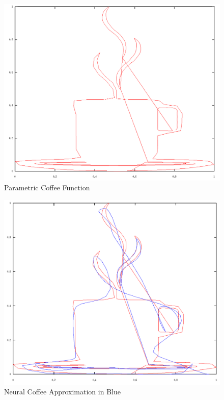 \documentclass{article}
\begin{document}
\begin{figure}[tb]
	\begin{center}
		\includegraphics[scale=0.45]{img/coffee1}
	\end{center}
	\caption{Parametric Coffee Function}
	\label{fig:coffee1}
\end{figure}

\begin{figure}[tb]
	\begin{center}
		\includegraphics[scale=0.4]{img/coffee4}
	\end{center}
	\caption{Neural Coffee Approximation in Blue}
	\label{fig:coffee4}
\end{figure}
\end{document}
